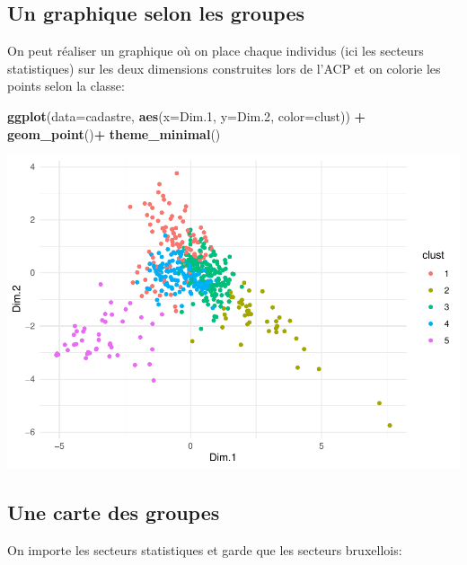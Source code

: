\documentclass[
]{book}
\newenvironment{Shaded}{\begin{snugshade}}{\end{snugshade}}
\newcommand{\AttributeTok}[1]{\textcolor[rgb]{0.13,0.29,0.53}{#1}}
\newcommand{\FloatTok}[1]{\textcolor[rgb]{0.00,0.00,0.81}{#1}}
\newcommand{\FunctionTok}[1]{\textcolor[rgb]{0.13,0.29,0.53}{\textbf{#1}}}
\newcommand{\NormalTok}[1]{#1}
\newcommand{\SpecialCharTok}[1]{\textcolor[rgb]{0.81,0.36,0.00}{\textbf{#1}}}
\begin{document}
\hypertarget{un-graphique-selon-les-groupes}{%
\subsection{Un graphique selon les groupes}\label{un-graphique-selon-les-groupes}}

On peut réaliser un graphique où on place chaque individus (ici les secteurs statistiques) sur les deux dimensions construites lors de l'ACP et on colorie les points selon la classe:

\begin{Shaded}
\begin{Highlighting}[]
\FunctionTok{ggplot}\NormalTok{(}\AttributeTok{data=}\NormalTok{cadastre,}
       \FunctionTok{aes}\NormalTok{(}\AttributeTok{x=}\NormalTok{Dim}\FloatTok{.1}\NormalTok{, }\AttributeTok{y=}\NormalTok{Dim}\FloatTok{.2}\NormalTok{, }\AttributeTok{color=}\NormalTok{clust)) }\SpecialCharTok{+}
  \FunctionTok{geom\_point}\NormalTok{()}\SpecialCharTok{+}
  \FunctionTok{theme\_minimal}\NormalTok{()}
\end{Highlighting}
\end{Shaded}

\includegraphics{manuel_geo_quanti_files/figure-latex/unnamed-chunk-101-1.pdf}

\hypertarget{une-carte-des-groupes}{%
\subsection{Une carte des groupes}\label{une-carte-des-groupes}}

On importe les secteurs statistiques et garde que les secteurs bruxellois:
\end{document}
